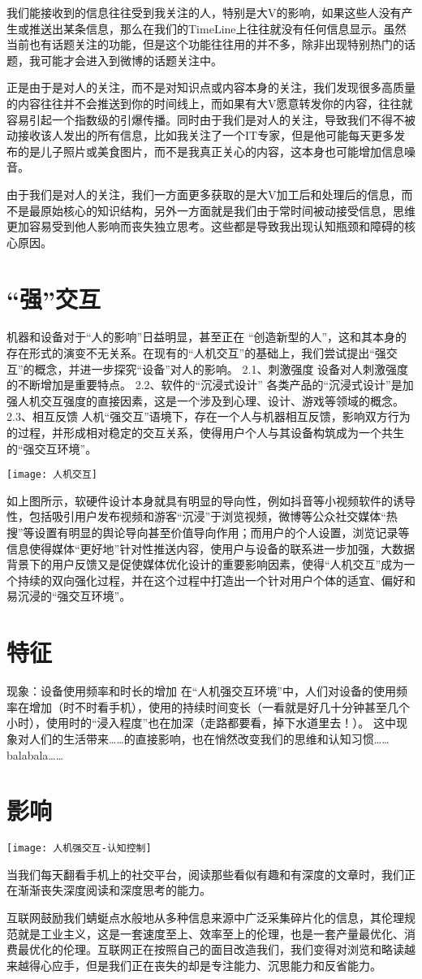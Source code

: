 我们能接收到的信息往往受到我关注的人，特别是大V的影响，如果这些人没有产生或推送出某条信息，那么在我们的TimeLine上往往就没有任何信息显示。虽然当前也有话题关注的功能，但是这个功能往往用的并不多，除非出现特别热门的话题，我可能才会进入到微博的话题关注中。

正是由于是对人的关注，而不是对知识点或内容本身的关注，我们发现很多高质量的内容往往并不会推送到你的时间线上，而如果有大V愿意转发你的内容，往往就容易引起一个指数级的引爆传播。同时由于我们是对人的关注，导致我们不得不被动接收该人发出的所有信息，比如我关注了一个IT专家，但是他可能每天更多发布的是儿子照片或美食图片，而不是我真正关心的内容，这本身也可能增加信息噪音。

由于我们是对人的关注，我们一方面更多获取的是大V加工后和处理后的信息，而不是最原始核心的知识结构，另外一方面就是我们由于常时间被动接受信息，思维更加容易受到他人影响而丧失独立思考。这些都是导致我出现认知瓶颈和障碍的核心原因。


\section{“强”交互}

机器和设备对于“人的影响”日益明显，甚至正在 “创造新型的人”，这和其本身的存在形式的演变不无关系。在现有的“人机交互”的基础上，我们尝试提出“强交互”的概念，并进一步探究“设备”对人的影响。
2.1、刺激强度
	设备对人刺激强度的不断增加是重要特点。
2.2、软件的“沉浸式设计”
	各类产品的“沉浸式设计”是加强人机交互强度的直接因素，这是一个涉及到心理、设计、游戏等领域的概念。
2.3、相互反馈
人机“强交互”语境下，存在一个人与机器相互反馈，影响双方行为的过程，并形成相对稳定的交互关系，使得用户个人与其设备构筑成为一个共生的“强交互环境”。

\texttt{[image: 人机交互]}

如上图所示，软硬件设计本身就具有明显的导向性，例如抖音等小视频软件的诱导性，包括吸引用户发布视频和游客“沉浸”于浏览视频，微博等公众社交媒体“热搜”等设置有明显的舆论导向甚至价值导向作用；而用户的个人设置，浏览记录等信息使得媒体“更好地”针对性推送内容，使用户与设备的联系进一步加强，大数据背景下的用户反馈又是促使媒体优化设计的重要影响因素，使得“人机交互”成为一个持续的双向强化过程，并在这个过程中打造出一个针对用户个体的适宜、偏好和易沉浸的“强交互环境”。
\section{特征}

现象：设备使用频率和时长的增加
	在“人机强交互环境”中，人们对设备的使用频率在增加（时不时看手机），使用的持续时间变长（一看就是好几十分钟甚至几个小时），使用时的“浸入程度”也在加深（走路都要看，掉下水道里去！）。
		这中现象对人们的生活带来……的直接影响，也在悄然改变我们的思维和认知习惯……balabala……

\section{影响}
\texttt{[image: 人机强交互-认知控制]}

当我们每天翻看手机上的社交平台，阅读那些看似有趣和有深度的文章时，我们正在渐渐丧失深度阅读和深度思考的能力。

互联网鼓励我们蜻蜓点水般地从多种信息来源中广泛采集碎片化的信息，其伦理规范就是工业主义，这是一套速度至上、效率至上的伦理，也是一套产量最优化、消费最优化的伦理。互联网正在按照自己的面目改造我们，我们变得对浏览和略读越来越得心应手，但是我们正在丧失的却是专注能力、沉思能力和反省能力。
